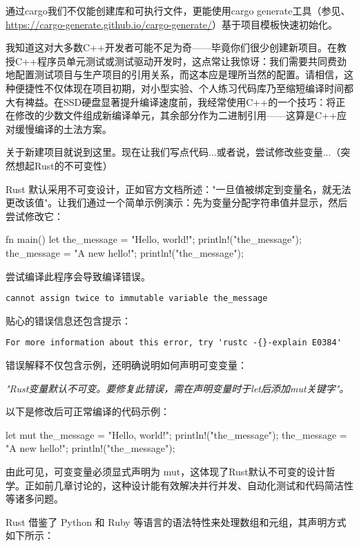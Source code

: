 通过cargo我们不仅能创建库和可执行文件，更能使用cargo generate工具（参见、\url{https://cargo-generate.github.io/cargo-generate/}）基于项目模板快速初始化。

我知道这对大多数C++开发者可能不足为奇——毕竟你们很少创建新项目。在教授C++程序员单元测试或测试驱动开发时，这点常让我惊讶：我们需要共同费劲地配置测试项目与生产项目的引用关系，而这本应是理所当然的配置。请相信，这种便捷性不仅体现在项目初期，对小型实验、个人练习代码库乃至缩短编译时间都大有裨益。在SSD硬盘显著提升编译速度前，我经常使用C++的一个技巧：将正在修改的少数文件组成新编译单元，其余部分作为二进制引用——这算是C++应对缓慢编译的土法方案。

关于新建项目就说到这里。现在让我们写点代码...或者说，尝试修改些变量...（突然想起Rust的不可变性）


Rust 默认采用不可变设计，正如官方文档所述："一旦值被绑定到变量名，就无法更改该值"。让我们通过一个简单示例演示：先为变量分配字符串值并显示，然后尝试修改它：

\begin{rust}
fn main() {
  let the_message = "Hello, world!";
  println!("{the_message}");
  the_message = "A new hello!";
  println!("{the_message}");
}
\end{rust}

尝试编译此程序会导致编译错误。

\verb|cannot assign twice to immutable variable the_message| 

贴心的错误信息还包含提示：

\verb|For more information about this error, try 'rustc -{}-explain E0384'|

错误解释不仅包含示例，还明确说明如何声明可变变量：

\textit{"Rust变量默认不可变。要修复此错误，需在声明变量时于let后添加mut关键字"。}

以下是修改后可正常编译的代码示例：

\begin{rust}
let mut the_message = "Hello, world!";
println!("{the_message}");
the_message = "A new hello!";
println!("{the_message}");
\end{rust}

由此可见，可变变量必须显式声明为 mut，这体现了Rust默认不可变的设计哲学。正如前几章讨论的，这种设计能有效解决并行并发、自动化测试和代码简洁性等诸多问题。


Rust 借鉴了 Python 和 Ruby 等语言的语法特性来处理数组和元组，其声明方式如下所示：

